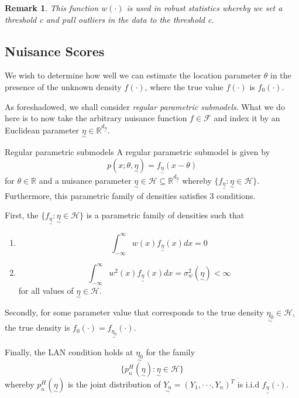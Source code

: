 \documentclass[twoside]{article}
\newtheorem{remark}[theorem]{Remark}
\newcommand{\sigmalgebra}{\mathcal{F}}
\newcommand{\real}{\mathbb{R}}
\newcommand{\utilde}{\underset{\sim}}
\begin{document}
\begin{remark}
This function $w(\cdot)$ is used in robust statistics whereby we set a threshold c and pull outliers in the data to the threshold c.
\end{remark}

\subsection{Nuisance Scores}
We wish to determine how well we can estimate the location parameter $\theta$ in the presence of the unknown density $f(\cdot)$, where the true value $f(\cdot)$ is $f_{0}(\cdot).$

As foreshadowed, we shall consider \textit{regular parametric submodels}. What we do here is to now take the arbitrary nuisance function $f \in \sigmalgebra$ and index it by an Euclidean parameter $\utilde{\eta} \in \real^{d_{\utilde{\eta}}}.$ 

\begin{definition_exam}{Regular parametric submodels}{} A regular parametric submodel is given by 
\begin{equation}
    p(x; \theta, \utilde{\eta}) = f_{\utilde{\eta}}(x - \theta)
\end{equation}
for $\theta \in \real$ and a nuisance parameter $\utilde{\eta} \in \mathcal{H} \subseteq \real^{d_{\utilde{\eta}}}$ whereby $\{f_{\utilde{\eta}}: \utilde{\eta} \in \mathcal{H}\}$. Furthermore, this parametric family of densities satisfies 3 conditions.


First, the $\{f_{\utilde{\eta}}: \utilde{\eta} \in \mathcal{H}\}$ is a parametric family of densities such that 
\begin{enumerate}
    \item $$\int_{-\infty}^{\infty}w(x)f_{\utilde{\eta}}(x)dx = 0$$
    \item $$\int_{-\infty}^{\infty}w^2(x)f_{\utilde{\eta}}(x)dx = \sigma_w^2(\utilde{\eta}) < \infty$$ for all values of $\utilde{\eta} \in \mathcal{H}.$
\end{enumerate}

Secondly, for some parameter value that corresponds to the true density $\utilde{\eta_{0}} \in \mathcal{H},$ the true density is $f_0(\cdot) = f_{\utilde{\eta_{0}}}(\cdot)$.

Finally, the LAN condition holds at $\utilde{\eta_{0}}$
 for the family 
 $$
 \{p_{n}^{H}(\utilde{\eta}): \utilde{\eta} \in \mathcal{H}\}
 $$
 whereby $p_{n}^{H}(\utilde{\eta})$ is the joint distribution of $\utilde{Y_{n}} = (Y_1, \cdot \cdot \cdot, Y_n)^T$ is i.i.d $f_{\utilde{\eta}}(\cdot).$
\end{definition_exam}
\end{document}
